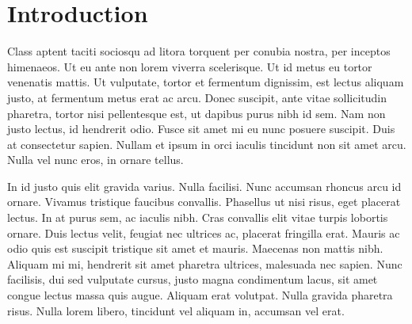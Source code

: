 \chapter{Introduction}
Class aptent taciti sociosqu ad litora torquent per conubia nostra, per inceptos himenaeos. Ut eu ante non lorem viverra scelerisque. Ut id metus eu tortor venenatis mattis. Ut vulputate, tortor et fermentum dignissim, est lectus aliquam justo, at fermentum metus erat ac arcu. Donec suscipit, ante vitae sollicitudin pharetra, tortor nisi pellentesque est, ut dapibus purus nibh id sem. Nam non justo lectus, id hendrerit odio. Fusce sit amet mi eu nunc posuere suscipit. Duis at consectetur sapien. Nullam et ipsum in orci iaculis tincidunt non sit amet arcu. Nulla vel nunc eros, in ornare tellus.

In id justo quis elit gravida varius. Nulla facilisi. Nunc accumsan rhoncus arcu id ornare. Vivamus tristique faucibus convallis. Phasellus ut nisi risus, eget placerat lectus. In at purus sem, ac iaculis nibh. Cras convallis elit vitae turpis lobortis ornare. Duis lectus velit, feugiat nec ultrices ac, placerat fringilla erat. Mauris ac odio quis est suscipit tristique sit amet et mauris. Maecenas non mattis nibh. Aliquam mi mi, hendrerit sit amet pharetra ultrices, malesuada nec sapien. Nunc facilisis, dui sed vulputate cursus, justo magna condimentum lacus, sit amet congue lectus massa quis augue. Aliquam erat volutpat. Nulla gravida pharetra risus. Nulla lorem libero, tincidunt vel aliquam in, accumsan vel erat.